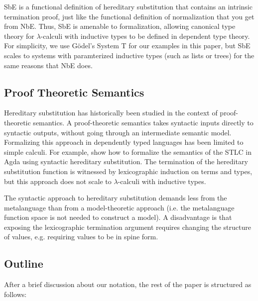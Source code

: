 \documentclass{llncs}
\begin{document}
SbE is a functional definition of hereditary substitution that
contains an intrinsic termination proof, just like the functional
definition of normalization that you get from NbE. Thus, SbE is
amenable to formalization, allowing canonical type theory for
$\lambda$-calculi with inductive types to be defined in dependent type
theory. For simplicity, we use G{\"o}del's System T for our examples
in this paper, but SbE scales to systems with paramterized inductive
types (such as lists or trees) for the same reasons that NbE does.

\subsection{Proof Theoretic Semantics}
\label{sec:proof-theoretic}

Hereditary substitution has historically been studied in the context
of proof-theoretic semantics. A proof-theoretic semantics takes
syntactic inputs directly to syntactic outputs, without going through
an intermediate semantic model. Formalizing this approach in
dependently typed languages has been limited to simple calculi.
For example, \cite{TODO} show how to formalize the
semantics of the STLC in Agda using syntactic hereditary substitution.
The termination of the hereditary substitution function is witnessed
by lexicographic induction on terms and types, but this approach does
not scale to $\lambda$-calculi with inductive types.

The syntactic approach to hereditary substitution
demands less from the metalanguage than from a model-theoretic
approach (i.e. the metalanguage
function space is not needed to construct a model). A disadvantage is
that exposing the lexicographic termination argument requires changing
the structure of values, e.g. requiring values to be in spine
form.

\subsection{Outline}

After a brief discussion about our notation, the rest of the paper is
structured as follows:
\end{document}
